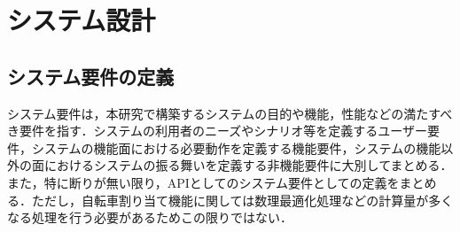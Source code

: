\section{システム設計}
  \label{sec:システム設計}
  \subsection{システム要件の定義}
    \label{sec:システム要件の定義}
      \par システム要件は，本研究で構築するシステムの目的や機能，性能などの満たすべき要件を指す．システムの利用者のニーズやシナリオ等を定義するユーザー要件，システムの機能面における必要動作を定義する機能要件，システムの機能以外の面におけるシステムの振る舞いを定義する非機能要件に大別してまとめる．また，特に断りが無い限り，APIとしてのシステム要件としての定義をまとめる．ただし，自転車割り当て機能に関しては数理最適化処理などの計算量が多くなる処理を行う必要があるためこの限りではない．

